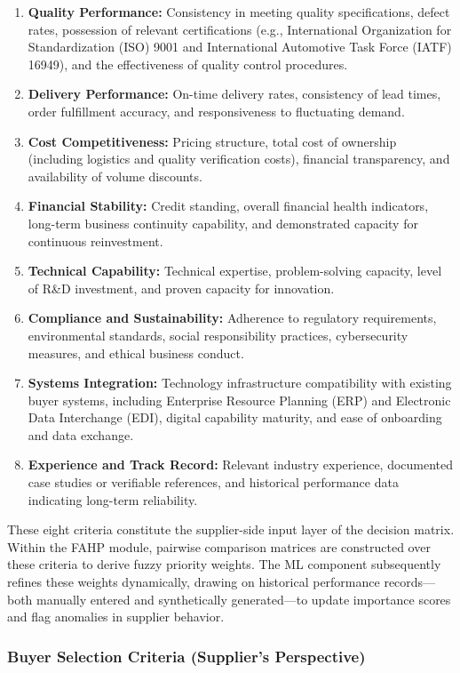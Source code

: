 \documentclass[11pt]{article}
\begin{document}
\begin{enumerate}
\item \textbf{Quality Performance:} Consistency in meeting quality specifications, defect rates, possession of relevant certifications (e.g., International Organization for Standardization (ISO) 9001 and International Automotive Task Force (IATF) 16949), and the effectiveness of quality control procedures.
\item \textbf{Delivery Performance:} On-time delivery rates, consistency of lead times, order fulfillment accuracy, and responsiveness to fluctuating demand.
\item \textbf{Cost Competitiveness:} Pricing structure, total cost of ownership (including logistics and quality verification costs), financial transparency, and availability of volume discounts.
\item \textbf{Financial Stability:} Credit standing, overall financial health indicators, long-term business continuity capability, and demonstrated capacity for continuous reinvestment.
\item \textbf{Technical Capability:} Technical expertise, problem-solving capacity, level of R\&D investment, and proven capacity for innovation.
\item \textbf{Compliance and Sustainability:} Adherence to regulatory requirements, environmental standards, social responsibility practices, cybersecurity measures, and ethical business conduct.
\item \textbf{Systems Integration:} Technology infrastructure compatibility with existing buyer systems, including Enterprise Resource Planning (ERP) and Electronic Data Interchange (EDI), digital capability maturity, and ease of onboarding and data exchange.
\item \textbf{Experience and Track Record:} Relevant industry experience, documented case studies or verifiable references, and historical performance data indicating long-term reliability.
\end{enumerate}

These eight criteria constitute the supplier-side input layer of the decision matrix. Within the FAHP module, pairwise comparison matrices are constructed over these criteria to derive fuzzy priority weights. The ML component subsequently refines these weights dynamically, drawing on historical performance records---both manually entered and synthetically generated---to update importance scores and flag anomalies in supplier behavior.

\subsubsection{Buyer Selection Criteria (Supplier's Perspective)}
\end{document}
